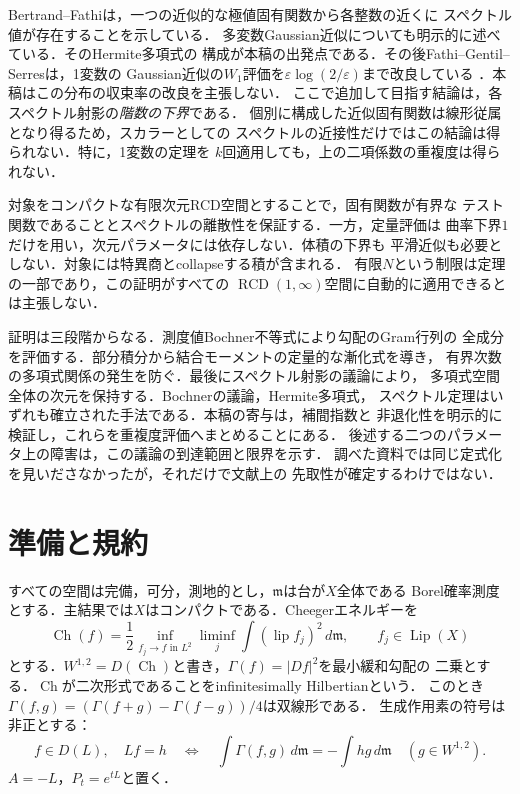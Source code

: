 \documentclass[12pt]{amsart}
\theoremstyle{definition}
\theoremstyle{remark}
\numberwithin{equation}{section}
\DeclareMathOperator{\Ch}{Ch}
\DeclareMathOperator{\Lip}{Lip}
\newcommand{\dm}{\,d\mathfrak m}
\newcommand{\eps}{\varepsilon}
\theoremstyle{plain}
\begin{document}
Bertrand--Fathiは，一つの近似的な極値固有関数から各整数の近くに
スペクトル値が存在することを示している\cite[Theorem 1.2]{ja:BF}．
多変数Gaussian近似についても明示的に述べている．そのHermite多項式の
構成が本稿の出発点である．その後Fathi--Gentil--Serresは，1変数の
Gaussian近似の$W_1$評価を$\eps\log(2/\eps)$まで改良している
\cite[Theorem 4.3]{ja:Serres}．本稿はこの分布の収束率の改良を主張しない．
ここで追加して目指す結論は，各スペクトル射影の\emph{階数の下界}である．
個別に構成した近似固有関数は線形従属となり得るため，スカラーとしての
スペクトルの近接性だけではこの結論は得られない．特に，1変数の定理を
$k$回適用しても，上の二項係数の重複度は得られない．

対象をコンパクトな有限次元RCD空間とすることで，固有関数が有界な
テスト関数であることとスペクトルの離散性を保証する．一方，定量評価は
曲率下界$1$だけを用い，次元パラメータには依存しない．体積の下界も
平滑近似も必要としない．対象には特異商とcollapseする積が含まれる．
有限$N$という制限は定理の一部であり，この証明がすべての
$\operatorname{RCD}(1,\infty)$空間に自動的に適用できるとは主張しない．

証明は三段階からなる．測度値Bochner不等式により勾配のGram行列の
全成分を評価する．部分積分から結合モーメントの定量的な漸化式を導き，
有界次数の多項式関係の発生を防ぐ．最後にスペクトル射影の議論により，
多項式空間全体の次元を保持する．Bochnerの議論，Hermite多項式，
スペクトル定理はいずれも確立された手法である．本稿の寄与は，補間指数と
非退化性を明示的に検証し，これらを重複度評価へまとめることにある．
後述する二つのパラメータ上の障害は，この議論の到達範囲と限界を示す．
調べた資料では同じ定式化を見いださなかったが，それだけで文献上の
先取性が確定するわけではない．

\section{準備と規約}
すべての空間は完備，可分，測地的とし，$\mathfrak m$は台が$X$全体である
Borel確率測度とする．主結果では$X$はコンパクトである．Cheegerエネルギーを
\[
 \Ch(f)=\frac12\inf_{f_j\to f\text{ in }L^2}
 \liminf_j\int (\operatorname{lip} f_j)^2\dm,
 \qquad f_j\in\Lip(X)
\]
とする．$W^{1,2}=D(\Ch)$と書き，$\Gamma(f)=|Df|^2$を最小緩和勾配の
二乗とする．$\Ch$が二次形式であることをinfinitesimally Hilbertianという．
このとき$\Gamma(f,g)=(\Gamma(f+g)-\Gamma(f-g))/4$は双線形である．
生成作用素の符号は非正とする：
\begin{equation}\label{ja:generator}
 f\in D(L),\quad Lf=h
 \quad\Longleftrightarrow\quad
 \int\Gamma(f,g)\dm=-\int hg\dm\quad(g\in W^{1,2}).
\end{equation}
$A=-L$，$P_t=e^{tL}$と置く．
\end{document}
